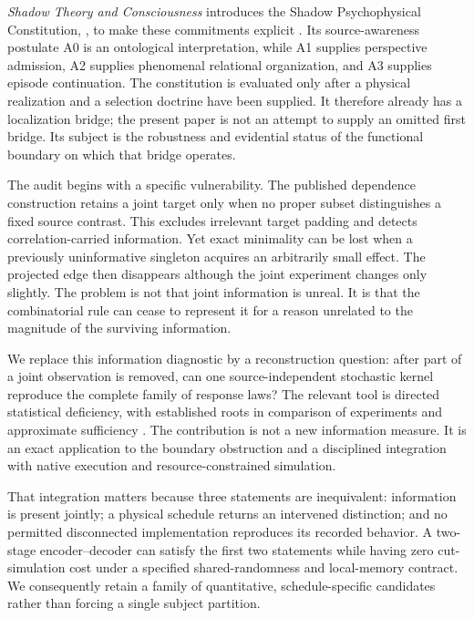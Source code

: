 \emph{Shadow Theory and Consciousness} introduces the Shadow Psychophysical Constitution, \SPC, to make these commitments explicit \cite{RodgersSPC2}. Its source-awareness postulate A0 is an ontological interpretation, while A1 supplies perspective admission, A2 supplies phenomenal relational organization, and A3 supplies episode continuation. The constitution is evaluated only after a physical realization and a selection doctrine have been supplied. It therefore already has a localization bridge; the present paper is not an attempt to supply an omitted first bridge. Its subject is the robustness and evidential status of the functional boundary on which that bridge operates.

The audit begins with a specific vulnerability. The published dependence construction retains a joint target only when no proper subset distinguishes a fixed source contrast. This excludes irrelevant target padding and detects correlation-carried information. Yet exact minimality can be lost when a previously uninformative singleton acquires an arbitrarily small effect. The projected edge then disappears although the joint experiment changes only slightly. The problem is not that joint information is unreal. It is that the combinatorial rule can cease to represent it for a reason unrelated to the magnitude of the surviving information.

We replace this information diagnostic by a reconstruction question: after part of a joint observation is removed, can one source-independent stochastic kernel reproduce the complete family of response laws? The relevant tool is directed statistical deficiency, with established roots in comparison of experiments and approximate sufficiency \cite{Blackwell1953,LeCam1964,vanRooyenWilliamson2014}. The contribution is not a new information measure. It is an exact application to the boundary obstruction and a disciplined integration with native execution and resource-constrained simulation.

That integration matters because three statements are inequivalent: information is present jointly; a physical schedule returns an intervened distinction; and no permitted disconnected implementation reproduces its recorded behavior. A two-stage encoder--decoder can satisfy the first two statements while having zero cut-simulation cost under a specified shared-randomness and local-memory contract. We consequently retain a family of quantitative, schedule-specific candidates rather than forcing a single subject partition.

